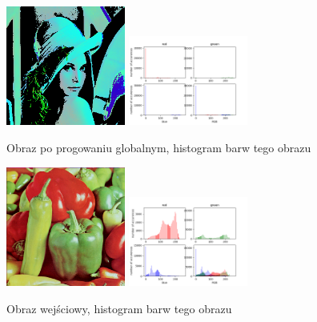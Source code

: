 \documentclass[final,a4paper,openany,12pt]{mwbk}
\begin{document}
\begin{figure}[H]
	\begin{center}
		\includegraphics[width=0.35\textwidth]{lena_color_globThreshold_result}
		\includegraphics[width=0.35\textwidth]{lena_color_globThreshold_histogram}
	\end{center}
	\caption{Obraz po progowaniu globalnym, histogram barw tego obrazu}
\end{figure}

\begin{figure}[H]
	\begin{center}
		\includegraphics[width=0.35\textwidth]{peppers_color}
		\includegraphics[width=0.35\textwidth]{peppers_color_histogram}
	\end{center}
	\caption{Obraz wejściowy, histogram barw tego obrazu}
\end{figure}
\end{document}
